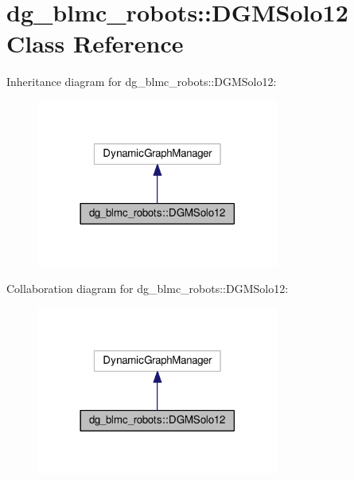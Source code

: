 \hypertarget{classdg__blmc__robots_1_1DGMSolo12}{}\section{dg\+\_\+blmc\+\_\+robots\+:\+:D\+G\+M\+Solo12 Class Reference}
\label{classdg__blmc__robots_1_1DGMSolo12}


Inheritance diagram for dg\+\_\+blmc\+\_\+robots\+:\+:D\+G\+M\+Solo12\+:
\nopagebreak
\begin{figure}[H]
\begin{center}
\leavevmode
\includegraphics[width=225pt]{classdg__blmc__robots_1_1DGMSolo12__inherit__graph}
\end{center}
\end{figure}


Collaboration diagram for dg\+\_\+blmc\+\_\+robots\+:\+:D\+G\+M\+Solo12\+:
\nopagebreak
\begin{figure}[H]
\begin{center}
\leavevmode
\includegraphics[width=225pt]{classdg__blmc__robots_1_1DGMSolo12__coll__graph}
\end{center}
\end{figure}
